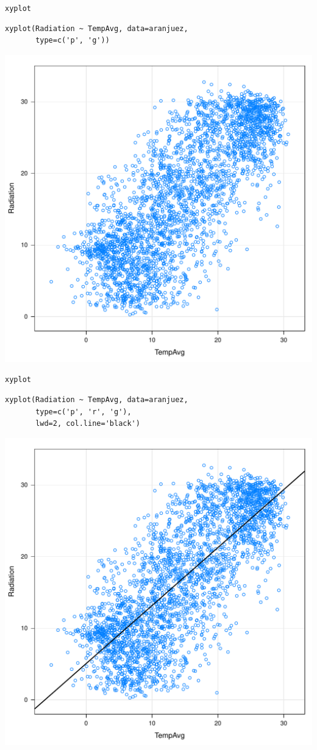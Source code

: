 \documentclass[xcolor={usenames,svgnames,dvipsnames}]{beamer}
\begin{document}
\begin{frame}[fragile,label=sec-2-1-3]{\texttt{xyplot}}
 \lstset{language=R,numbers=none}
\begin{lstlisting}
xyplot(Radiation ~ TempAvg, data=aranjuez,
       type=c('p', 'g'))
\end{lstlisting}

\includegraphics[width=.9\linewidth]{figs/xyplotPG.pdf}
\end{frame}

\begin{frame}[fragile,label=sec-2-1-4]{\texttt{xyplot}}
 \lstset{language=R,numbers=none}
\begin{lstlisting}
xyplot(Radiation ~ TempAvg, data=aranjuez,
       type=c('p', 'r', 'g'),
       lwd=2, col.line='black')
\end{lstlisting}

\includegraphics[width=.9\linewidth]{figs/xyplotPRG.pdf}
\end{frame}
\end{document}
